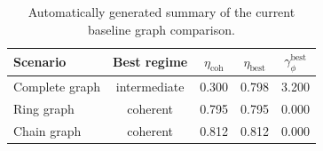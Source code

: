 \begin{table}[t]
\centering
\caption{Automatically generated summary of the current baseline graph comparison.}
\begin{tabular}{lcccc}
\toprule
Scenario & Best regime & $\eta_{\mathrm{coh}}$ & $\eta_{\mathrm{best}}$ & $\gamma_{\phi}^{\mathrm{best}}$ \\
\midrule
Complete graph & intermediate & 0.300 & 0.798 & 3.200 \\
Ring graph & coherent & 0.795 & 0.795 & 0.000 \\
Chain graph & coherent & 0.812 & 0.812 & 0.000 \\
\bottomrule
\end{tabular}
\end{table}
